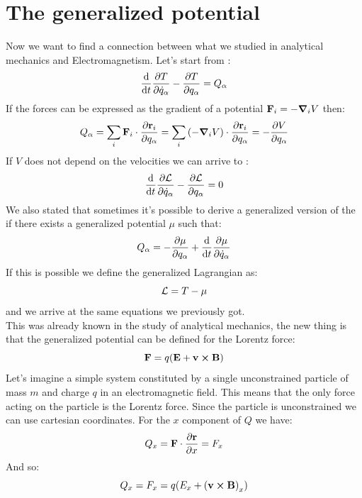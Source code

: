 \section{The generalized potential}
Now we want to find a connection between what we studied in analytical mechanics and Electromagnetism. Let's start from \lagrangeref :
\begin{equation}
  \dv{}{t}\pdv{T}{\dot{q}_{\alpha}} -\pdv{T}{q_{\alpha}} = Q_{\alpha}
\end{equation}
If the forces can be expressed as the gradient of a potential $\vb{F}_i = -\grad_i V$ then:
\begin{equation}
  Q_{\alpha} = \bigsum_i \vec{F}_i \cdot \pdv{\vec{r}_i}{q_{\alpha}} = \bigsum_i \brackets{-\grad_i V} \cdot \pdv{\vec{r}_i}{q_{\alpha}} = -\pdv{V}{q_{\alpha}}
\end{equation}
If $V$ does not depend on the velocities we can arrive to \eleref :
\begin{equation}
  \dv{}{t}\pdv{\lagr}{\dot{q}_{\alpha}} - \pdv{\lagr}{q_{\alpha}} = 0
\end{equation}
We also stated that sometimes it's possible to derive a generalized version of the \eleref\;if there exists a generalized potential $\mu$ such that:
\begin{equation}
  Q_{\alpha} = -\pdv{\mu}{q_{\alpha}} + \dv{}{t}\pdv{\mu}{\dot{q}_{\alpha}}
\end{equation}
If this is possible we define the generalized Lagrangian as:
\begin{equation}
  \mathcal{L} = T - \mu
\end{equation}
and we arrive at the same equations we previously got.\\
This was already known in the study of analytical mechanics, the new thing is that the generalized potential can be defined for the Lorentz force:
\begin{equation}
  \vb{F} = q (\vb{E} + \vb{v} \cross \vb{B})
\end{equation}
Let's imagine a simple system constituted by a single unconstrained particle of mass $m$ and charge $q$ in an electromagnetic field. This means that the only force acting on the particle is the Lorentz force. Since the particle is unconstrained we can use cartesian coordinates. For the $x$ component of $Q$ we have:
\begin{equation}
  Q_x = \vec{F} \cdot \pdv{\vec{r}}{x} = F_x
\end{equation}
And so:
\begin{equation}
  Q_x = F_x = q (E_x + \left(\vb{v} \cross \vb{B}\right)_x)
\end{equation}
